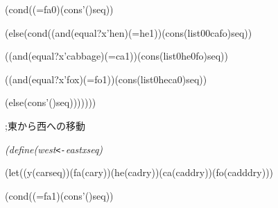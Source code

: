\documentclass{article}
\begin{document}
\noindent
\mbox{}{\it {}\charwd}(cond{\it {}\charwd}((={\it {}\charwd}fa{\it {}\charwd}0){\it {}\charwd}(cons{\it {}\charwd}'(){\it {}\charwd}seq))

\noindent
\mbox{}{\it {}\charwd}{\it {}\charwd}(else{\it {}\charwd}(cond{\it {}\charwd}((and{\it {}\charwd}(equal?{\it {}\charwd}x{\it {}\charwd}'hen){\it {}\charwd}(={\it {}\charwd}he{\it {}\charwd}1)){\it {}\charwd}(cons{\it {}\charwd}(list{\it {}\charwd}0{\it {}\charwd}0{\it {}\charwd}ca{\it {}\charwd}fo){\it {}\charwd}seq))

\noindent
\mbox{}{\it {}\charwd}{\it {}\charwd}{\it {}\charwd}((and{\it {}\charwd}(equal?{\it {}\charwd}x{\it {}\charwd}'cabbage){\it {}\charwd}(={\it {}\charwd}ca{\it {}\charwd}1)){\it {}\charwd}(cons{\it {}\charwd}(list{\it {}\charwd}0{\it {}\charwd}he{\it {}\charwd}0{\it {}\charwd}fo){\it {}\charwd}seq))

\noindent
\mbox{}{\it {}\charwd}{\it {}\charwd}{\it {}\charwd}((and{\it {}\charwd}(equal?{\it {}\charwd}x{\it {}\charwd}'fox){\it {}\charwd}(={\it {}\charwd}fo{\it {}\charwd}1)){\it {}\charwd}(cons{\it {}\charwd}(list{\it {}\charwd}0{\it {}\charwd}he{\it {}\charwd}ca{\it {}\charwd}0){\it {}\charwd}seq))

\noindent
\mbox{}{\it {}\charwd}{\it {}\charwd}{\it {}\charwd}(else{\it {}\charwd}(cons{\it {}\charwd}'(){\it {}\charwd}seq)))))))

\noindent
\mbox{}\hfill

\noindent
\mbox{}\rm\mc \rm\mc %

\noindent
\mbox{};\charwd 東から西への移動

\noindent
\mbox{}\it (define{\it {}\charwd}(west{\tt <}{\tt -}east{\it {}\charwd}x{\it {}\charwd}seq)

\noindent
\mbox{}{\it {}\charwd}(let{\tt *}{\it {}\charwd}((y{\it {}\charwd}(car{\it {}\charwd}seq)){\it {}\charwd}(fa{\it {}\charwd}(car{\it {}\charwd}y)){\it {}\charwd}(he{\it {}\charwd}(cadr{\it {}\charwd}y)){\it {}\charwd}(ca{\it {}\charwd}(caddr{\it {}\charwd}y)){\it {}\charwd}(fo{\it {}\charwd}(cadddr{\it {}\charwd}y)))

\noindent
\mbox{}{\it {}\charwd}(cond{\it {}\charwd}((={\it {}\charwd}fa{\it {}\charwd}1){\it {}\charwd}(cons{\it {}\charwd}'(){\it {}\charwd}seq))
\end{document}

